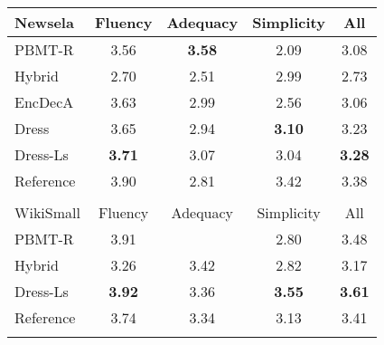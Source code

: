 \documentclass[11pt,letterpaper]{article}
\begin{document}
\begin{table}[t]
	\centering
	\setlength{\belowcaptionskip}{-.5cm}
	\small
	\begin{tabular}{|@{~} l@{~} |@{~} c@{~} c@{~}  c@{~}  c@{~} |}
		\hline
		Newsela & Fluency & Adequacy & Simplicity & All \\
		\hline
		\hline
		PBMT-R & 3.56 & \hspace*{2ex}\bf{3.58}& \hspace*{2ex}2.09 & \hspace*{2ex}3.08 \\
		Hybrid & \hspace*{2ex}2.70 & \hspace*{2ex}2.51 & 2.99 & \hspace*{2ex}2.73 \\
		EncDecA & 3.63 & 2.99 & \hspace*{2ex}2.56 & \hspace*{2ex}3.06 \\
		{\sc Dress} & 3.65 & 2.94 & \bf{3.10} & 3.23 \\
		{\sc Dress-Ls} & \bf{3.71} & 3.07 & 3.04 & \bf{3.28} \\
		Reference & 3.90 & \hspace*{2ex}2.81 & \hspace*{2ex}3.42 & 3.38 \\ \hline
		\multicolumn{4}{c}{} \\\hline
		WikiSmall & Fluency & Adequacy & Simplicity & All \\
		\hline
		\hline
		PBMT-R & 3.91 & \hspace*{2ex}{\bf 3.74} & \hspace{2ex}2.80 & \hspace{1ex}3.48 \\
		Hybrid & \hspace*{2ex}3.26 & 3.42 & \hspace{2ex}2.82 & \hspace{2ex}3.17 \\
		{\sc Dress-Ls} & \bf{3.92} & 3.36 & \bf{3.55} & \bf{3.61} \\
		Reference & \hspace{1ex}3.74 & 3.34 & \hspace{2ex}3.13 & \hspace{2ex}3.41 \\\hline
		\multicolumn{4}{c}{} \\\hline
		

\end{tabular}
\end{table}
\end{document}
